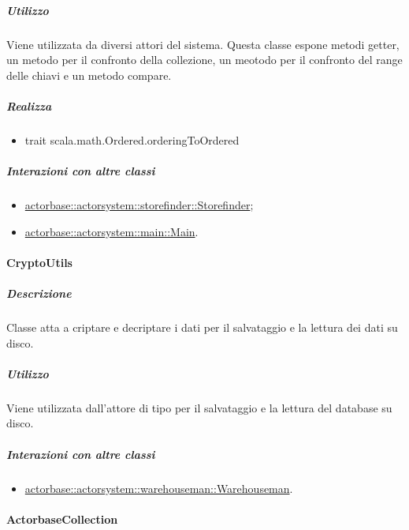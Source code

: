 \documentclass{scalatekids-article}
\begin{document}
\subparagraph{Utilizzo}
Viene utilizzata da diversi attori del sistema. Questa classe espone metodi
getter, un metodo per il confronto della collezione, un meotodo per il
confronto del range delle chiavi e un metodo compare.

\subparagraph{Realizza}
\begin{itemize}
\item trait scala.math.Ordered.orderingToOrdered
\end{itemize}

\subparagraph{Interazioni con altre classi}

\begin{itemize}
\item \hyperref[sec:actorbase::actorsystem::storefinder::Storefinder]{actorbase::actorsystem::storefinder::Storefinder};
\item \hyperref[sec:actorbase::actorsystem::main::Main]{actorbase::actorsystem::main::Main}.
\end{itemize}


\paragraph{CryptoUtils}
\label{sec:actorbase::actorsystem::utils::CryptoUtils}

\subparagraph{Descrizione}
Classe atta a criptare e decriptare i dati per il salvataggio e la lettura dei dati su disco.

\subparagraph{Utilizzo}
Viene utilizzata dall'attore di tipo  per il salvataggio e la lettura del database su disco.

\subparagraph{Interazioni con altre classi}

\begin{itemize}
\item \hyperref[sec:actorbase::actorsystem::warehouseman::Warehouseman]{actorbase::actorsystem::warehouseman::Warehouseman}.
\end{itemize}


\paragraph{ActorbaseCollection}
\label{sec:actorbase::actorsystem::utils::ActorbaseCollection}
\end{document}
